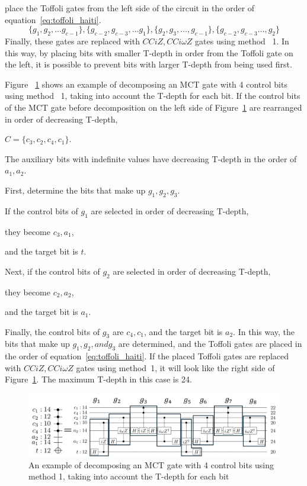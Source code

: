 place the Toffoli gates from the left side of the circuit in the order of equation~\ref{eq:toffoli_haiti}.
\begin{equation}\label{eq:toffoli_haiti}
\{g_{1}, g_{2}, \dots g_{c-1}\},\{g_{c-2},g_{c-3},\dots g_{1}\}, \{g_{2},g_{3},\dots ,g_{c-1}\}, \{g_{c-2}, g_{c-3}\dots ,g_{2}\}
\end{equation}
Finally, these gates are replaced with $CCiZ, CCi\omega Z$ gates using method ~1.
In this way, by placing bits with smaller T-depth in order from the Toffoli gate on the left,
it is possible to prevent bits with larger T-depth from being used first.
\par
Figure ~\ref{b2mapping_proposed} shows an example of decomposing an MCT gate with 4 control bits using method ~1, taking into account the T-depth for each bit.
If the control bits of the MCT gate before decomposition on the left side of Figure~\ref{b2mapping_proposed} are rearranged in order of decreasing T-depth,

$C=\{c_{3}, c_{2}, c_{4}, c_{1}\}$.

The auxiliary bits with indefinite values have decreasing T-depth in the order of $a_{1}, a_{2}$.

First, determine the bits that make up $g_{1}, g_{2}, g_{3}$.

If the control bits of $g_{1}$ are selected in order of decreasing T-depth,

they become $c_{3}, a_{1}$,

and the target bit is $t$.

Next, if the control bits of $g_{2}$ are selected in order of decreasing T-depth,

they become $c_{2}, a_{2}$,

and the target bit is $a_{1}$.

Finally, the control bits of $g_{3}$ are $c_{4}, c_{1}$,
and the target bit is $a_{2}$.
In this way, the bits that make up $g_{1}, g_{2}, and g_{3}$ are determined,
and the Toffoli gates are placed in the order of equation~\ref{eq:toffoli_haiti}.
If the placed Toffoli gates are replaced with $CCiZ, CCi\omega Z$ gates using method~1,
it will look like the right side of Figure~\ref{b2mapping_proposed}. The maximum T-depth in this case is 24.
\begin{figure}
\centering
\includegraphics[width=0.95\linewidth]{img/b2_mapping_proposed.pdf}
\caption{An example of decomposing an MCT gate with 4 control bits using method 1, taking into account the T-depth for each bit}
\label{b2mapping_proposed}
\end{figure}

